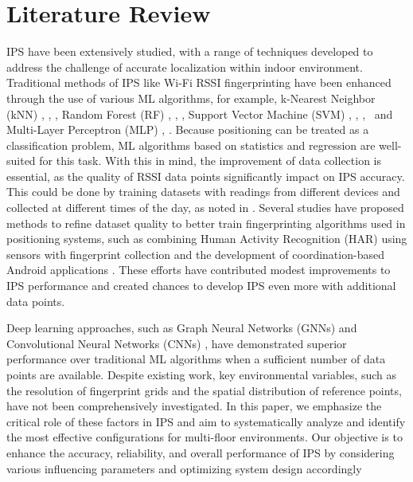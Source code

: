 \documentclass[runningheads]{llncs}
\begin{document}
\section{Literature Review}
IPS have been extensively studied, with a range of techniques developed to address the challenge of accurate localization within indoor environment. Traditional methods of IPS like Wi-Fi RSSI fingerprinting have been enhanced through the use of various ML algorithms, for example, k-Nearest Neighbor (kNN) \cite{LRE1}, \cite{LRE2}, \cite{LRE6}, Random Forest (RF) \cite{LRE1}, \cite{LRE6}, \cite{LRE5}, Support Vector Machine (SVM) \cite{LRE1}, \cite{LRE2}, \cite{LRE6},~\cite{add1} and Multi-Layer Perceptron (MLP) \cite{LRE1}, \cite{LRE2}. Because positioning can be treated as a classification problem,  ML algorithms based on statistics and regression are well-suited for this task. With this in mind, the improvement of data collection is essential, as the quality of RSSI data points significantly impact on IPS accuracy. This could be done by training datasets with readings from different devices and collected at different times of the day, as noted in \cite{LRE3}. Several studies have proposed methods to refine dataset quality to better train fingerprinting algorithms used in positioning systems, such as combining Human Activity Recognition (HAR) using sensors with fingerprint collection \cite{LRE4} and the development of coordination-based Android applications \cite{LRE7}. These efforts have contributed modest improvements to IPS performance and created chances to develop IPS even more with additional data points. 

Deep learning approaches, such as Graph Neural Networks (GNNs) \cite{LRE2} and Convolutional Neural Networks (CNNs) \cite{LRE4}, have demonstrated superior performance over traditional ML algorithms when a sufficient number of data points are available. Despite existing work, key environmental variables, such as the resolution of fingerprint grids and the spatial distribution of reference points, have not been comprehensively investigated. In this paper, we emphasize the critical role of these factors in IPS and aim to systematically analyze and identify the most effective configurations for multi-floor environments. Our objective is to enhance the accuracy, reliability, and overall performance of IPS by considering various influencing parameters and optimizing system design accordingly

\end{document}
